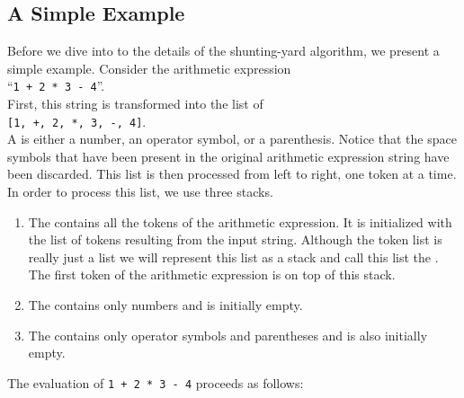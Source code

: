 \subsection{A Simple Example}
Before we dive into to the details of the shunting-yard algorithm, we present a
simple example.  Consider the arithmetic expression 
\\[0.2cm]
\hspace*{1.3cm} 
``\texttt{1 + 2 * 3 - 4}''. 
\\[0.2cm]
First, this string is transformed into the list of 
\\[0.2cm]
\hspace*{1.3cm}
\texttt{[1, +, 2, *, 3, -, 4]}.
\\[0.2cm]
A  is either a number, an operator symbol, or a parenthesis.
Notice that the space symbols that have been present in the original arithmetic expression string
have been discarded.  This list is then processed from left to right, one token
 at a time.  In order to process this list, we use three stacks.
\begin{enumerate}
\item The   contains all the tokens of the arithmetic expression.  It is
      initialized with the list of tokens resulting from the input string.
      Although the token list is really just a list we will represent this list as a stack and call
      this list the .
      The first token of the arithmetic expression is on top of this stack.
\item The   contains only numbers and is initially empty.
\item The  contains only operator symbols and parentheses and is also initially
      empty.
\end{enumerate}
The evaluation of \texttt{1 + 2 * 3 - 4} proceeds as follows:
